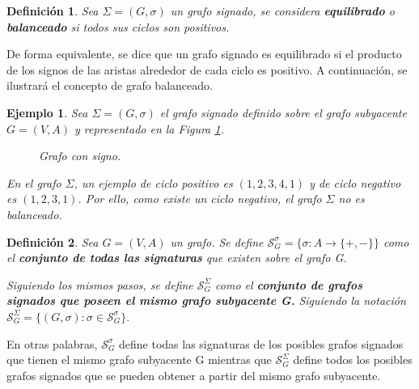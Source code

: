 \documentclass[11pt,a4paper,spanish]{report}
\theoremstyle{plain}
\newtheorem{definicion}{Definición}[chapter]
\newtheorem{ejemplo}{Ejemplo}[chapter]
\begin{document}
\begin{definicion}\cite{harary1953notion} Sea $\Sigma=(G,\sigma)$ un grafo signado, se considera \textbf{equilibrado} o \textbf{balanceado} si todos sus ciclos son positivos.
\end{definicion}
De forma equivalente, se dice que un grafo signado es equilibrado si el producto de los signos de las aristas alrededor de cada ciclo es positivo. A continuación, se ilustrará el concepto de grafo balanceado.
\begin{ejemplo}
Sea $\Sigma=(G,\sigma)$ el grafo signado definido sobre el grafo subyacente $G=(V,A)$ y representado en la Figura \ref{fig:grafo-signos}.
\begin{figure}[H]
\begin{center}
\end{center}
     \caption{{Grafo con signo.}}
     \label{fig:grafo-signos}
\end{figure}


En el grafo $\Sigma$, un ejemplo de ciclo positivo es $(1,2,3,4,1)$ y de ciclo negativo es $(1,2,3,1)$. Por ello, como existe un ciclo negativo, el grafo $\Sigma$ no es balanceado.
\end{ejemplo}

\begin{definicion}
Sea \(G=(V,A)\) un grafo. Se define
\(\mathcal{S}^\sigma_G=\{\sigma:A\to\{+,-\}\}\) como el \textbf{conjunto de todas las signaturas} que existen sobre el grafo G. 


Siguiendo los mismos pasos, se define \(\mathcal{S}^\Sigma_G\) como el \textbf{conjunto de grafos signados que poseen el mismo grafo subyacente G.} Siguiendo la notación  $\mathcal{S}^\Sigma_G= \{(G,\sigma): \sigma \in \mathcal{S}^\sigma_G\}.$

\end{definicion}
En otras palabras, \(\mathcal{S}^\sigma_G\) define todas las  signaturas de los posibles grafos signados que tienen el mismo grafo subyacente G mientras que $\mathcal{S}^\Sigma_G$ define todos los posibles grafos signados que se pueden obtener a partir del mismo grafo subyacente.
\end{document}
